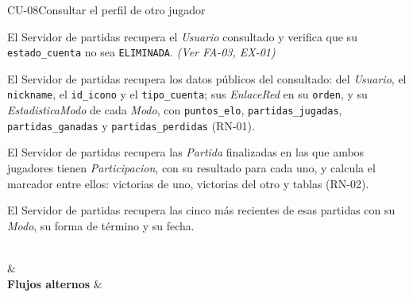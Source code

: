 \begin{fichacu}{CU-08}{Consultar el perfil de otro jugador}
{\begin{cuenum}[start=1]
      \item El Servidor de partidas recupera el \textit{Usuario} consultado y verifica que su \texttt{estado\_\allowbreak{}cuenta} no sea \texttt{ELIMINADA}. \textit{(Ver \mbox{FA-03}, \mbox{EX-01})}
      \item El Servidor de partidas recupera los datos públicos del consultado: del \textit{Usuario}, el \texttt{nickname}, el \texttt{id\_\allowbreak{}icono} y el \texttt{tipo\_\allowbreak{}cuenta}; sus \textit{EnlaceRed} en su \texttt{orden}, y su \textit{EstadisticaModo} de cada \textit{Modo}, con \texttt{puntos\_\allowbreak{}elo}, \texttt{partidas\_\allowbreak{}jugadas}, \texttt{partidas\_\allowbreak{}ganadas} y \texttt{partidas\_\allowbreak{}perdidas} (\mbox{RN-01}).
      \item El Servidor de partidas recupera las \textit{Partida} finalizadas en las que ambos jugadores tienen \textit{Participacion}, con su resultado para cada uno, y calcula el marcador entre ellos: victorias de uno, victorias del otro y tablas (\mbox{RN-02}).
      \item El Servidor de partidas recupera las cinco más recientes de esas partidas con su \textit{Modo}, su forma de término y su fecha.
    \end{cuenum}} \\
   &  \\ \hline
  \textbf{Flujos alternos} & 
\end{fichacu}

